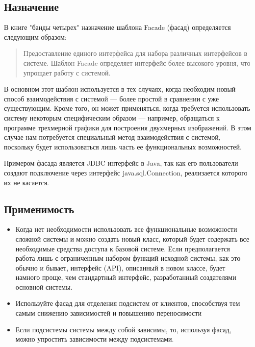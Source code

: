 \documentclass[10pt]{article}
\begin{document}
\subsection{Назначение}
В книге "банды четырех" назначение шаблона Facade (фасад) определяется
следующим образом:
\begin{quote}
Предоставление единого интерфейса для набора различных интерфейсов в системе.
Шаблон Facade определяет интерфейс более высокого уровня, что упрощает
работу с системой.
\end{quote}
В основном этот шаблон используется в тех случаях, когда необходим новый
способ взаимодействия с системой --- более простой в сравнении с уже существующим.
Кроме того, он может применяться, когда требуется использовать систему некоторым
специфическим образом --- например, обращаться к программе трехмерной графики
для построения двухмерных изображений. В этом случае нам потребуется специальный
метод взаимодействия с системой, поскольку будет использоваться лишь часть ее
функциональных возможностей.

Примером фасада является JDBC интерфейс в Java, так как его пользователи
создают подключение через интерфейс java.sql.Connection, реализается
которого их не касается.
\subsection{Применимость}
\begin{itemize}
	\item  Когда нет необходимости использовать все функциональные возможности
сложной системы и можно создать новый класс, который будет содержать все
необходимые средства доступа к базовой системе. Если предполагается работа
лишь с ограниченным набором функций исходной системы, как это обычно и
бывает, интерфейс (API), описанный в новом классе, будет намного проще, чем
стандартный интерфейс, разработанный создателями основной системы.
	\item Используйте фасад для отделения подсистем от клиентов,
	способствуя тем самым снижению зависимостей и повышению переносимости
	\item Если подсистемы системы между собой зависимы, то, используя фасад,
		можно упростить зависимости между подсистемами.
\end{itemize}
\end{document}

